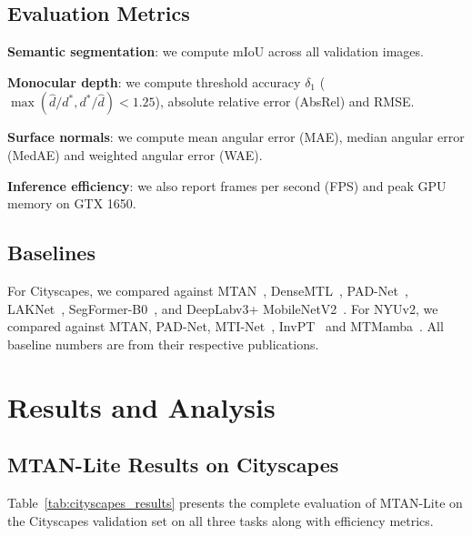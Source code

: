 \documentclass[journal, onecolumn]{IEEEtran}
\begin{document}
\subsection{Evaluation Metrics}

\textbf{Semantic segmentation}: we compute mIoU across all validation images.

\textbf{Monocular depth}: we compute threshold accuracy $\delta_1$ ($\max(\hat{d}/d^{*}, d^{*}/\hat{d}) < 1.25$), absolute relative error (AbsRel) and RMSE.

\textbf{Surface normals}: we compute mean angular error (MAE), median angular error (MedAE) and weighted angular error (WAE).

\textbf{Inference efficiency}: we also report frames per second (FPS) and peak GPU memory on GTX 1650.

\subsection{Baselines}

For Cityscapes, we compared against MTAN~\cite{liu2019mtan}, DenseMTL~\cite{lopes2023densemtl}, PAD-Net~\cite{xu2018padnet}, LAKNet~\cite{laknet2025}, SegFormer-B0~\cite{xie2021segformer}, and DeepLabv3+ MobileNetV2~\cite{chen2018deeplabv3plus}. For NYUv2, we compared against MTAN, PAD-Net, MTI-Net~\cite{vandenhende2020mti}, InvPT~\cite{ye2022invpt} and MTMamba~\cite{lin2024mtmamba}. All baseline numbers are from their respective publications.

\section{Results and Analysis}

\subsection{MTAN-Lite Results on Cityscapes}

Table~\ref{tab:cityscapes_results} presents the complete evaluation of MTAN-Lite on the Cityscapes validation set on all three tasks along with efficiency metrics.
\end{document}
